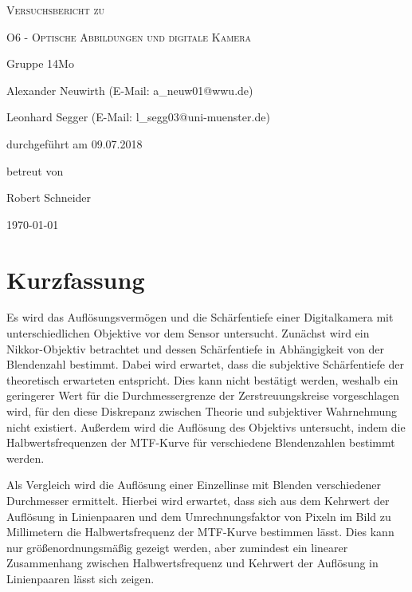\documentclass[
	a4paper,
	12pt,
	pagesize,
	ngerman
]{scrartcl}
\begin{document}
	
	\begin{titlepage}
		\centering
		{\scshape\LARGE Versuchsbericht zu \par}
		\vspace{1cm}
		{\scshape\huge O6 - Optische Abbildungen und digitale Kamera \par}
		\vspace{2.5cm}
		{\LARGE Gruppe 14Mo \par}
		\vspace{0.5cm}
		
		{\large Alexander Neuwirth (E-Mail: a\_neuw01@wwu.de) \par}
		{\large Leonhard Segger (E-Mail: l\_segg03@uni-muenster.de) \par}
		\vfill
		
		durchgeführt am 09.07.2018\par
		betreut von\par
		{\large Robert Schneider} 
		
		\vfill
		
		{\large \today\par}
	\end{titlepage}
	\tableofcontents
	\newpage


	\section{Kurzfassung}
	Es wird das Auflösungsvermögen und die Schärfentiefe einer Digitalkamera mit unterschiedlichen Objektive vor dem Sensor untersucht.
	Zunächst wird ein Nikkor-Objektiv betrachtet und dessen Schärfentiefe in Abhängigkeit von der Blendenzahl bestimmt.
	Dabei wird erwartet, dass die subjektive Schärfentiefe der theoretisch erwarteten entspricht.
	Dies kann nicht bestätigt werden, weshalb ein geringerer Wert für die Durchmessergrenze der Zerstreuungskreise vorgeschlagen wird, für den diese Diskrepanz zwischen Theorie und subjektiver Wahrnehmung nicht existiert.
	Außerdem wird die Auflösung des Objektivs untersucht, indem die Halbwertsfrequenzen der MTF-Kurve für verschiedene Blendenzahlen bestimmt werden.
	
	Als Vergleich wird die Auflösung einer Einzellinse mit Blenden verschiedener Durchmesser ermittelt.
	Hierbei wird erwartet, dass sich aus dem Kehrwert der Auflösung in Linienpaaren und dem Umrechnungsfaktor von Pixeln im Bild zu Millimetern die Halbwertsfrequenz der MTF-Kurve bestimmen lässt.
	Dies kann nur größenordnungsmäßig gezeigt werden, aber zumindest ein linearer Zusammenhang zwischen Halbwertsfrequenz und Kehrwert der Auflösung in Linienpaaren lässt sich zeigen.
	
\end{document}
